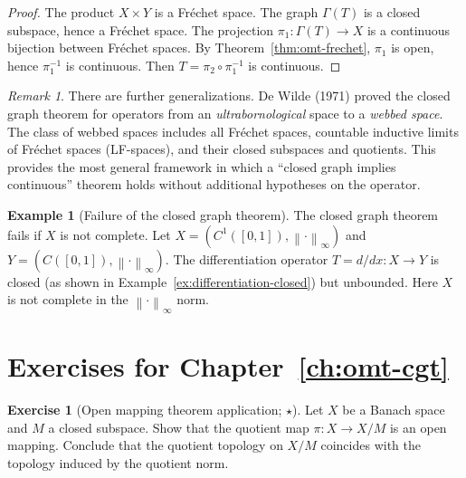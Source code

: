 \documentclass[a4paper,12pt]{book}
\newcommand{\norm}[1]{\left\| #1 \right\|}
\theoremstyle{definition}
\newtheorem{example}[definition]{Example}
\newtheorem{exercise}{Exercise}[chapter]
\theoremstyle{plain}
\theoremstyle{remark}
\newtheorem{remark}[definition]{Remark}
\begin{document}
\begin{proof}
The product $X \times Y$ is a Fr\'echet space. The graph $\Gamma(T)$ is a closed
subspace, hence a Fr\'echet space. The projection $\pi_1 \colon \Gamma(T) \to X$
is a continuous bijection between Fr\'echet spaces. By
Theorem~\ref{thm:omt-frechet}, $\pi_1$ is open, hence $\pi_1^{-1}$ is continuous.
Then $T = \pi_2 \circ \pi_1^{-1}$ is continuous.
\end{proof}

\begin{remark}\label{rem:webbed-spaces}
There are further generalizations. De Wilde (1971) proved the closed graph theorem
for operators from an \emph{ultrabornological} space
to a \emph{webbed space}. The class of webbed spaces includes all Fr\'echet spaces,
countable inductive limits of Fr\'echet spaces (LF-spaces), and
their closed subspaces and quotients. This provides the most general framework in
which a ``closed graph implies continuous'' theorem holds without additional
hypotheses on the operator.
\end{remark}

\begin{example}[Failure of the closed graph theorem]\label{ex:cgt-failure}
The closed graph theorem fails if $X$ is not complete. Let $X = (C^1([0,1]),
\norm{\cdot}_\infty)$ and $Y = (C([0,1]), \norm{\cdot}_\infty)$. The differentiation
operator $T = d/dx \colon X \to Y$ is closed (as shown in
Example~\ref{ex:differentiation-closed}) but unbounded. Here $X$ is not complete
in the $\norm{\cdot}_\infty$ norm.
\end{example}

\section{Exercises for Chapter~\ref{ch:omt-cgt}}\label{sec:omt-cgt-exercises}

\begin{exercise}[Open mapping theorem application; $\star$]\label{ex:omt-surjective-quotient}
Let $X$ be a Banach space and $M$ a closed subspace. Show that the quotient map
$\pi \colon X \to X/M$ is an open mapping. Conclude that the quotient topology on
$X/M$ coincides with the topology induced by the quotient norm.
\end{exercise}
\end{document}
